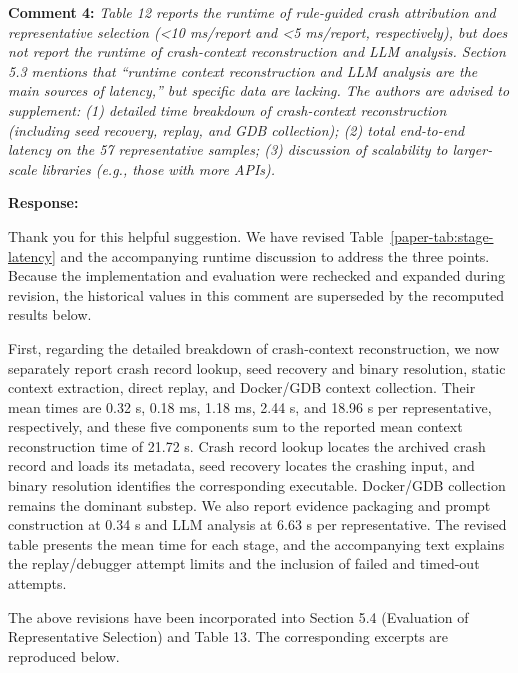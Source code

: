 \documentclass[onecolumn,11pt]{article}
\newcommand{\secc}[2]{\par\mySep \noindent \textsf{\textbf{#1 }}\textit{#2}\par}
\newcommand{\secr}[2]{\par\mySep \noindent \textsf{\textbf{#1 }}{#2}\par}
\newcommand{\mySep}{\vspace{8pt}}
\begin{document}
\secc{Comment 4:}{Table 12 reports the runtime of rule-guided crash attribution and representative selection (\textless{}10 ms/report and \textless{}5 ms/report, respectively), but does not report the runtime of crash-context reconstruction and LLM analysis. Section 5.3 mentions that ``runtime context reconstruction and LLM analysis are the main sources of latency,'' but specific data are lacking. The authors are advised to supplement: (1) detailed time breakdown of crash-context reconstruction (including seed recovery, replay, and GDB collection); (2) total end-to-end latency on the 57 representative samples; (3) discussion of scalability to larger-scale libraries (e.g., those with more APIs).}
\secr{Response:}{Thank you for this helpful suggestion. We have revised Table~\ref{paper-tab:stage-latency} and the accompanying runtime discussion to address the three points. Because the implementation and evaluation were rechecked and expanded during revision, the historical values in this comment are superseded by the recomputed results below.

First, regarding the detailed breakdown of crash-context reconstruction, we now separately report crash record lookup, seed recovery and binary resolution, static context extraction, direct replay, and Docker/GDB context collection. Their mean times are 0.32 s, 0.18 ms, 1.18 ms, 2.44 s, and 18.96 s per representative, respectively, and these five components sum to the reported mean context reconstruction time of 21.72 s. Crash record lookup locates the archived crash record and loads its metadata, seed recovery locates the crashing input, and binary resolution identifies the corresponding executable. Docker/GDB collection remains the dominant substep. We also report evidence packaging and prompt construction at 0.34 s and LLM analysis at 6.63 s per representative. The revised table presents the mean time for each stage, and the accompanying text explains the replay/debugger attempt limits and the inclusion of failed and timed-out attempts.

The above revisions have been incorporated into Section 5.4 (Evaluation of Representative Selection) and Table 13. The corresponding excerpts are reproduced below.}
\end{document}
